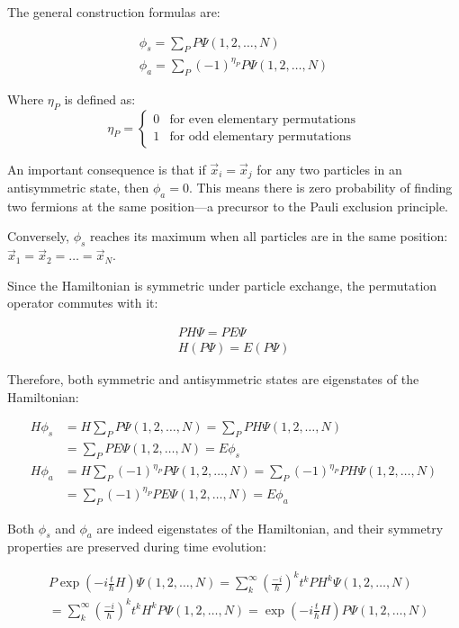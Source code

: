 The general construction formulas are:

\begin{gather}
\phi_s=\sum_P P\Psi(1,2,\ldots,N) \\
\phi_a=\sum_P(-1)^{\eta_P}P\Psi(1,2,\ldots,N)
\end{gather}

Where $\eta_P$ is defined as:
\[
\eta_P= \begin{cases}
0 & \text{for even elementary permutations} \\
1 & \text{for odd elementary permutations}
\end{cases}
\]

An important consequence is that if $\vec{x}_i=\vec{x}_j$ for any two particles in an antisymmetric state, then $\phi_a=0$. This means there is zero probability of finding two fermions at the same position—a precursor to the Pauli exclusion principle.

Conversely, $\phi_s$ reaches its maximum when all particles are in the same position: $\vec{x}_1=\vec{x}_2=\ldots=\vec{x}_N$.

Since the Hamiltonian is symmetric under particle exchange, the permutation operator commutes with it:

\begin{gather}
PH\Psi=PE\Psi\\
H(P\Psi)=E(P\Psi)
\end{gather}

Therefore, both symmetric and antisymmetric states are eigenstates of the Hamiltonian:

\begin{align}
H\phi_s&=H\sum_P P\Psi(1,2,\ldots,N)=\sum_P PH\Psi(1,2,\ldots,N)\\
&=\sum_P PE\Psi(1,2,\ldots,N)=E\phi_s \\
H\phi_a&=H\sum_P(-1)^{\eta_P}P\Psi(1,2,\ldots,N)=\sum_P(-1)^{\eta_P}PH\Psi(1,2,\ldots,N)\\
&=\sum_P(-1)^{\eta_P}PE\Psi(1,2,\ldots,N)=E\phi_a
\end{align}


Both $\phi_s$ and $\phi_a$ are indeed eigenstates of the Hamiltonian, and their symmetry properties are preserved during time evolution:

\begin{align}
&P\exp(-i\frac{t}{\hbar}H)\Psi(1,2,\ldots,N)=\sum_{k}^{\infty}(\frac{-i}{\hbar})^k t^k PH^k\Psi(1,2,\ldots,N)\\
&=\sum_{k}^{\infty}(\frac{-i}{\hbar})^k t^k H^kP\Psi(1,2,\ldots,N)=\exp(-i\frac{t}{\hbar}H)P\Psi(1,2,\ldots,N)
\end{align}

